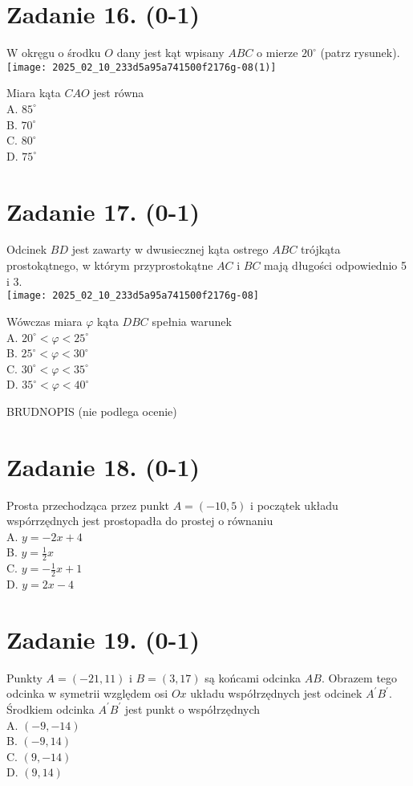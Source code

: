 \documentclass[10pt]{article}
\begin{document}
\section*{Zadanie 16. (0-1)}
W okręgu o środku \(O\) dany jest kąt wpisany \(A B C\) o mierze \(20^{\circ}\) (patrz rysunek).\\
\texttt{[image: 2025\_02\_10\_233d5a95a741500f2176g-08(1)]}

Miara kąta \(C A O\) jest równa\\
A. \(85^{\circ}\)\\
B. \(70^{\circ}\)\\
C. \(80^{\circ}\)\\
D. \(75^{\circ}\)

\section*{Zadanie 17. (0-1)}
Odcinek \(B D\) jest zawarty w dwusiecznej kąta ostrego \(A B C\) trójkąta prostokątnego, w którym przyprostokątne \(A C\) i \(B C\) mają długości odpowiednio 5 i 3.\\
\texttt{[image: 2025\_02\_10\_233d5a95a741500f2176g-08]}

Wówczas miara \(\varphi\) kąta \(D B C\) spełnia warunek\\
A. \(20^{\circ}<\varphi<25^{\circ}\)\\
B. \(25^{\circ}<\varphi<30^{\circ}\)\\
C. \(30^{\circ}<\varphi<35^{\circ}\)\\
D. \(35^{\circ}<\varphi<40^{\circ}\)

BRUDNOPIS (nie podlega ocenie)\\
\(\qquad\)

\section*{Zadanie 18. (0-1)}
Prosta przechodząca przez punkt \(A=(-10,5)\) i początek układu wspórrzędnych jest prostopadła do prostej o równaniu\\
A. \(y=-2 x+4\)\\
B. \(y=\frac{1}{2} x\)\\
C. \(y=-\frac{1}{2} x+1\)\\
D. \(y=2 x-4\)

\section*{Zadanie 19. (0-1)}
Punkty \(A=(-21,11)\) i \(B=(3,17)\) są końcami odcinka \(A B\). Obrazem tego odcinka w symetrii względem osi \(O x\) układu współrzędnych jest odcinek \(A^{\prime} B^{\prime}\). Środkiem odcinka \(A^{\prime} B^{\prime}\) jest punkt o współrzędnych\\
A. \((-9,-14)\)\\
B. \((-9,14)\)\\
C. \((9,-14)\)\\
D. \((9,14)\)
\end{document}

